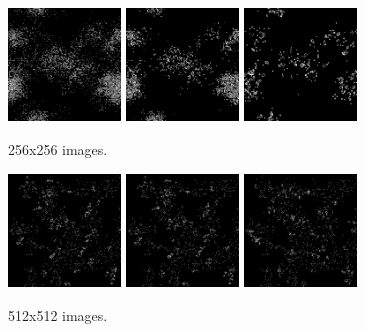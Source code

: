 \documentclass{article}
\begin{document}
\begin{multicols}{2}
\begin{figure}[H]
\centering
\includegraphics[width=3cm]{pngimages/256-1.png}
\includegraphics[width=3cm]{pngimages/256-2.png}
\includegraphics[width=3cm]{pngimages/256-100.png}
\caption{256x256 images.}
\end{figure}

\begin{figure}[H]
\centering
\includegraphics[width=3cm]{pngimages/512-1.png}
\includegraphics[width=3cm]{pngimages/512-2.png}
\includegraphics[width=3cm]{pngimages/512-100.png}
\caption{512x512 images.}
\end{figure}


\end{multicols}
\end{document}
